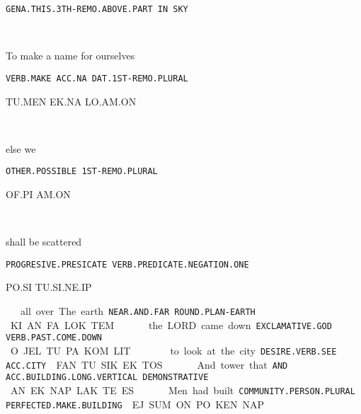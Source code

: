 {{\tt GENA.THIS.3TH-REMO.ABOVE.PART	IN	SKY }

\ta\es\aj\ef\pu~		\Atlanin ~	\som 
\drie

  

To make 	a name 		for ourselves		 

{\tt VERB.MAKE	ACC.NA		DAT.1ST-REMO.PLURAL	 }

TU.MEN	EK.NA		LO.AM.ON 

\tu\men~	\ek\na~		\lo\am\on 
\drie

 

else 			we 

{\tt OTHER.POSSIBLE	1ST-REMO.PLURAL }

OF.PI			AM.ON 

\of\Atlanpi ~ \am\on
\drie
 

shall be			    scattered			

{\tt PROGRESIVE.PRESICATE    VERB.PREDICATE.NEGATION.ONE        }

PO.SI			     TU.SI.NE.IP		 

\po\si~\am\om
\drie 

all over			The earth 

{\tt NEAR.AND.FAR		ROUND.PLAN-EARTH }

KI.AN.FA		LOK.TEM 

\ki\an\fa ~ \lok\tem
\drie 
 

the LORD 		came down 			

{\tt EXCLAMATIVE.GOD         VERB.PAST.COME.DOWN		}

O.JEL			TU.PA.KOM.LIT			 

\Atlano\jel ~ \tu\pa\kom\lit 
\drie 

to look			at the city 

{\tt DESIRE.VERB.SEE	ACC.CITY }

FAN.TU.SIK		EK.TOS 

\fan\tu\sik ~ \ek\tos
\drie 
  

And 	tower 				that 			 

{\tt AND	ACC.BUILDING.LONG.VERTICAL	DEMONSTRATIVE	 }

AN	EK.NAP.LAK.TE			ES			 

\an~\ek\nap\lak\te ~\es
 

Men				had built 

{\tt COMMUNITY.PERSON.PLURAL	PERFECTED.MAKE.BUILDING }

EJ.SUM.ON			PO.KEN.NAP 

\ej\Atlansum\on ~ \po\ken\nap
  
\drie 

}

